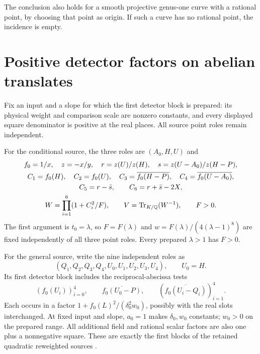 \documentclass[11pt,a4paper]{article}
\newcommand{\Q}{\mathbb Q}\newcommand{\Z}{\mathbb Z}
\begin{document}
The conclusion also holds for a smooth projective genus-one curve
with a rational point, by choosing that point as origin. If such a
curve has no rational point, the incidence is empty.

\section{Positive detector factors on abelian translates}
Fix an input and a slope for which the first detector block is
prepared: its physical weight and comparison scale are nonzero
constants, and every displayed square denominator is positive at
the real places. All source point roles remain independent.

For the conditional source, the three roles are $(A_0,H,U)$ and
\[
\begin{gathered}
 f_0=1/x,\quad z=-x/y,\quad
 r=z(U)/z(H),\quad s=z(U-A_0)/z(H-P),\\
 C_1=f_0(H),\quad C_2=f_0(U),\quad
 C_3=\overline{f_0(H-P)},\quad C_4=\overline{f_0(U-A_0)},\\
 C_5=r-\bar s,\qquad C_6=r+\bar s-2X,\\
 W=\prod_{i=1}^{6}(1+C_i^2/F),\qquad
 V=\Tr_{K/\Q}(W^{-1}),\qquad F>0.
\end{gathered}
\]
The first argument is $t_0=\lambda$, so $F=F(\lambda)$ and
$w=F(\lambda)/(4(\lambda-1)^8)$ are fixed independently of
all three point roles. Every prepared $\lambda>1$ has $F>0$.

For the general source, write the nine independent roles as
\[
 (Q_1,Q_2,Q_3,Q_4,U_0,U_1,U_2,U_3,U_4),\qquad U_0=H.
\]
Its first detector block includes the reciprocal-abscissa tests
\[
 (f_0(U_i))_{i=0}^4,\qquad
 \overline{f_0(U_0-P)},\qquad
 (\overline{f_0(U_i-Q_i)})_{i=1}^4.
\]
Each occurs in a factor $1+f_0(L)^2/(\delta_0^2w_0)$, possibly
with the real slots interchanged. At fixed input and slope,
$a_0=1$ makes $\delta_0,w_0$ constants; $w_0>0$ on the prepared
range. All additional field and rational scalar factors are also
one plus a nonnegative square. These are exactly the first blocks
of the retained quadratic reweighted sources \cite{Reweighted}.
\end{document}
